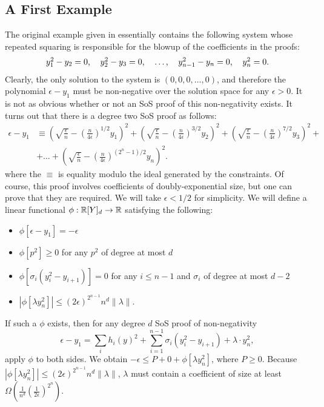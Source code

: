 \documentclass[a4paper,UKenglish]{lipics-v2016}
\begin{document}
\subsection{A First Example}
The original example given in \cite{odonnell17} essentially contains the following system whose repeated squaring is responsible for the blowup of the coefficients in the proofs:
\[\begin{tabular}{ccccc}
$y_1^2 - y_2 = 0$, & $y_2^2 - y_3 = 0$, & $\dots$, & $y_{n-1}^2 - y_n = 0$, & $y_n^2 = 0$.
\end{tabular}\]
Clearly, the only solution to the system is $(0,0,0,\dots,0)$, and therefore the polynomial $\epsilon - y_1$ must be non-negative over the solution space for any $\epsilon > 0$. It is not as obvious whether or not an SoS proof of this non-negativity exists. It turns out that there is a degree two SoS proof as follows:
\begin{align}
\epsilon - y_1 &\equiv \left(\sqrt{\frac{\epsilon}{n}} - \left(\frac{n}{4\epsilon}\right)^{1/2}y_1\right)^2 + \left(\sqrt{\frac{\epsilon}{n}} - \left(\frac{n}{4\epsilon}\right)^{3/2}y_2\right)^2 + \left(\sqrt{\frac{\epsilon}{n}} - \left(\frac{n}{4\epsilon}\right)^{7/2}y_3\right)^2 + \nonumber\\
&+\dots + \left(\sqrt{\frac{\epsilon}{n}} - \left(\frac{n}{4\epsilon}\right)^{(2^n-1)/2}y_n\right)^2.\label{eq:proof}\tag{$*$}
\end{align}
where the $\equiv$ is equality modulo the ideal generated by the constraints. Of course, this proof involves coefficients of doubly-exponential size, but one can prove that they are required. We will take $\epsilon < 1/2$ for simplicity. We will define a linear functional $\phi: \mathbb R[Y]_d \rightarrow \mathbb R$ satisfying the following:
\begin{itemize}
\item $\phi[\epsilon - y_1] = -\epsilon$
\item $\phi[p^2] \geq 0$ for any $p^2$ of degree at most $d$
\item $\phi[\sigma_i(y_i^2 - y_{i+1})] = 0$ for any $i \leq n-1$ and $\sigma_i$ of degree at most $d-2$
\item $|\phi[\lambda y_n^2]| \leq (2\epsilon)^{2^{n-1}}n^d\|\lambda\|$.
\end{itemize}
If such a $\phi$ exists, then for any degree $d$ SoS proof of non-negativity
\[\epsilon - y_1 = \sum_i h_i(y)^2 + \sum_{i=1}^{n-1} \sigma_i(y_i^2 - y_{i+1}) + \lambda \cdot y_n^2,\]
apply $\phi$ to both sides. We obtain $-\epsilon \leq P + 0 + \phi[\lambda y_n^2]$, where $P \geq 0$. Because $|\phi[\lambda y_n^2]| \leq (2\epsilon)^{2^{n-1}}n^d\|\lambda\|$, $\lambda$ must contain a coefficient of size at least $\Omega(\frac{1}{n^d}\left(\frac{1}{2\epsilon}\right)^{2^n})$.
\end{document}
